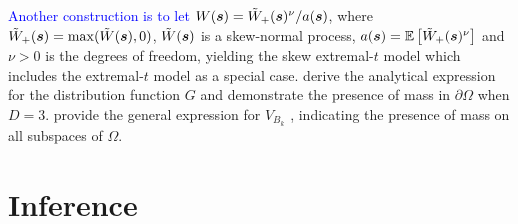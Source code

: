 \documentclass[12pt]{article}
\newcommand{\PZ}{\textcolor{blue}}
\begin{document}
\PZ{Another construction is to let $W({\boldsymbol{s}})= \tilde{W}_+({\boldsymbol{s}})^\nu / a({\boldsymbol{s}})$}, where $\tilde{W}_+({\boldsymbol{s}}) = \max(\tilde W({\boldsymbol{s}}),0)$, $\tilde W({\boldsymbol{s}})$ is a skew-normal process, $a({\boldsymbol{s}}) = \mathbb{E} \left[ \tilde{W}_+({\boldsymbol{s}})^\nu \right]$ and $\nu>0$ is the degrees of freedom, yielding the skew extremal-$t$ model \citep{Beranger.etal:2017} which includes the extremal-$t$ model \citep{Opitz:2013} as a special case. \citet{Beranger.etal:2017} derive the analytical expression for the distribution function $G$ and demonstrate the presence of mass in $\partial\Omega$ when $D=3$.
\cite{Beranger.etal:2021} provide the general expression for $V_{B_k}$ \citep[see][for results specific to the extremal-$t$]{Thibaud.Opitz:2015}, indicating the presence of mass on all subspaces of 
$\Omega$.

\section{Inference}
\label{sec:inference}

\end{document}
